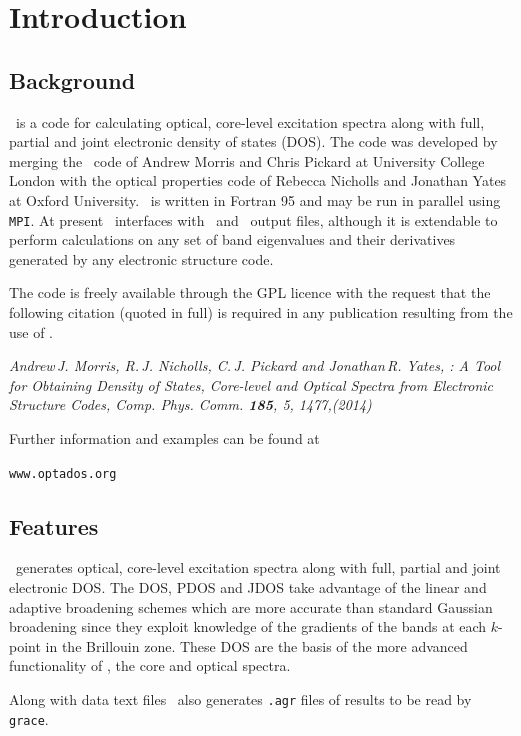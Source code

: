 \documentclass[a4paper,11pt,twoside]{book}
\begin{document}
\chapter{Introduction}\label{chap:introduction}
\section{Background}
\optados\ is a code for calculating optical, core-level excitation spectra along with full, partial and joint electronic density of states (DOS).  The code was developed by merging the \lindos\ code of Andrew Morris and Chris Pickard at University College London with the optical properties code of Rebecca Nicholls and Jonathan Yates at Oxford University.  \optados\ is written in Fortran 95 and may be run in parallel using {\tt MPI}.  At present \optados\ interfaces with \castep\ and \onetep\ output files, although it is extendable to perform calculations on any set of band eigenvalues and their derivatives generated by any electronic structure code.

The code is freely available through the GPL licence with the request that the following citation (quoted in full) is required in any publication resulting from the use of \optados.

\emph{Andrew\,J. Morris, R.\,J. Nicholls, C.\,J. Pickard and Jonathan\,R. Yates, \optados: A Tool for Obtaining Density of States, Core-level and Optical Spectra from Electronic Structure Codes,  Comp. Phys. Comm. {\bf 185}, 5, 1477,(2014)}

\begin{center}
Further information and examples can be found at

\verb#www.optados.org#
\end{center}


\section{Features}
\optados\ generates optical, core-level excitation spectra along with full, partial and joint electronic DOS. The DOS, PDOS and JDOS take advantage of the linear and adaptive broadening schemes which are more accurate than standard Gaussian broadening since they exploit knowledge of the gradients of the bands at each $k$-point in the Brillouin zone.  These DOS are the basis of the more advanced functionality of \optados, the core and optical spectra.

Along with data text files \optados\ also generates \verb#.agr# files of results to be read by \verb#grace#. 
\end{document}
